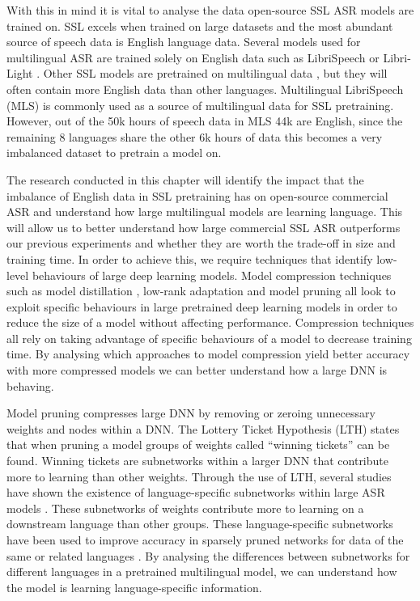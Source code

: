 With this in mind it is vital to analyse the data open-source SSL ASR models are trained on. SSL excels when trained on large datasets and the most abundant source of speech data is English language data. Several models \cite{wav2vec, hsu2021hubert} used for multilingual ASR are trained solely on English data such as LibriSpeech \cite{librispeech} or Libri-Light \cite{librilight}. Other SSL models are pretrained on multilingual data \cite{babu2021xlsr, XLSR-53}, but they will often contain more English data than other languages. Multilingual LibriSpeech (MLS) \cite{MLS} is commonly used as a source of multilingual data for SSL pretraining. However, out of the 50k hours of speech data in MLS 44k are English, since the remaining 8 languages share the other 6k hours of data this becomes a very imbalanced dataset to pretrain a model on. 

The research conducted in this chapter will identify the impact that the imbalance of English data in SSL pretraining has on open-source commercial ASR and understand how large multilingual models are learning language. This will allow us to better understand how large commercial SSL ASR outperforms our previous experiments and whether they are worth the trade-off in size and training time. In order to achieve this, we require techniques that identify low-level behaviours of large deep learning models. Model compression techniques such as model distillation \cite{distillation}, low-rank adaptation \cite{hu2021lora} and model pruning \cite{han2015learning} all look to exploit specific behaviours in large pretrained deep learning models in order to reduce the size of a model without affecting performance. Compression techniques all rely on taking advantage of specific behaviours of a model to decrease training time. By analysing which approaches to model compression yield better accuracy with more compressed models we can better understand how a large DNN is behaving. 

Model pruning compresses large DNN by removing or zeroing unnecessary weights and nodes within a DNN. The Lottery Ticket Hypothesis (LTH) \cite{frankle2018LTH} states that when pruning a model groups of weights called ``winning tickets'' can be found. Winning tickets are subnetworks within a larger DNN that contribute more to learning than other weights. Through the use of LTH, several studies have shown the existence of language-specific subnetworks within large ASR models \cite{PARP}. These subnetworks of weights contribute more to learning on a downstream language than other groups. These language-specific subnetworks have been used to improve accuracy in sparsely pruned networks for data of the same or related languages \cite{Lu_Language_adap_xlsr, yang2023learning}. By analysing the differences between subnetworks for different languages in a pretrained multilingual model, we can understand how the model is learning language-specific information.

